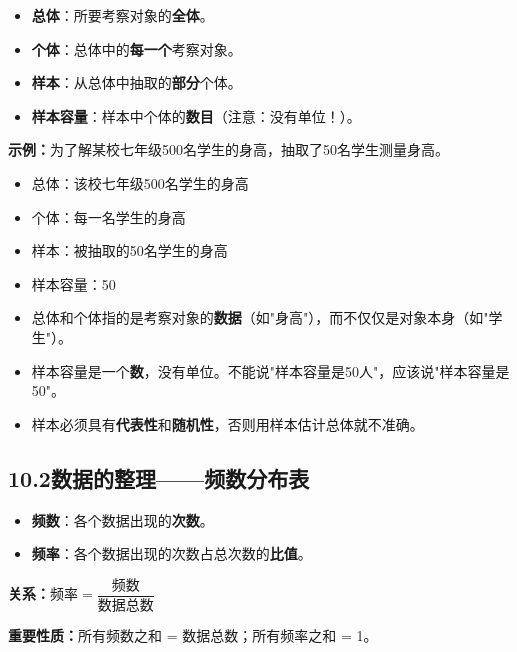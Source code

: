 \documentclass[12pt, a4paper]{ctexart}
\begin{document}
\begin{knowledgebox}[10.1.2 总体、个体、样本与样本容量]
\begin{itemize}[leftmargin=2em]
  \item \textbf{总体}：所要考察对象的\textbf{全体}。
  \item \textbf{个体}：总体中的\textbf{每一个}考察对象。
  \item \textbf{样本}：从总体中抽取的\textbf{部分}个体。
  \item \textbf{样本容量}：样本中个体的\textbf{数目}（注意：没有单位！）。
\end{itemize}

\textbf{示例：}为了解某校七年级500名学生的身高，抽取了50名学生测量身高。

\begin{itemize}[leftmargin=2em]
  \item 总体：该校七年级500名学生的身高
  \item 个体：每一名学生的身高
  \item 样本：被抽取的50名学生的身高
  \item 样本容量：50
\end{itemize}
\end{knowledgebox}

\begin{warnbox}[易错提醒]
\begin{itemize}[leftmargin=2em]
  \item 总体和个体指的是考察对象的\textbf{数据}（如"身高"），而不仅仅是对象本身（如"学生"）。
  \item 样本容量是一个\textbf{数}，没有单位。不能说"样本容量是50人"，应该说"样本容量是50"。
  \item 样本必须具有\textbf{代表性}和\textbf{随机性}，否则用样本估计总体就不准确。
\end{itemize}
\end{warnbox}

\subsection*{10.2\quad 数据的整理——频数分布表}

\begin{knowledgebox}[10.2.1 频数与频率]
\begin{itemize}[leftmargin=2em]
  \item \textbf{频数}：各个数据出现的\textbf{次数}。
  \item \textbf{频率}：各个数据出现的次数占总次数的\textbf{比值}。
\end{itemize}

\textbf{关系：}$\text{频率} = \dfrac{\text{频数}}{\text{数据总数}}$

\textbf{重要性质：}所有频数之和 = 数据总数；所有频率之和 = 1。
\end{knowledgebox}
\end{document}
